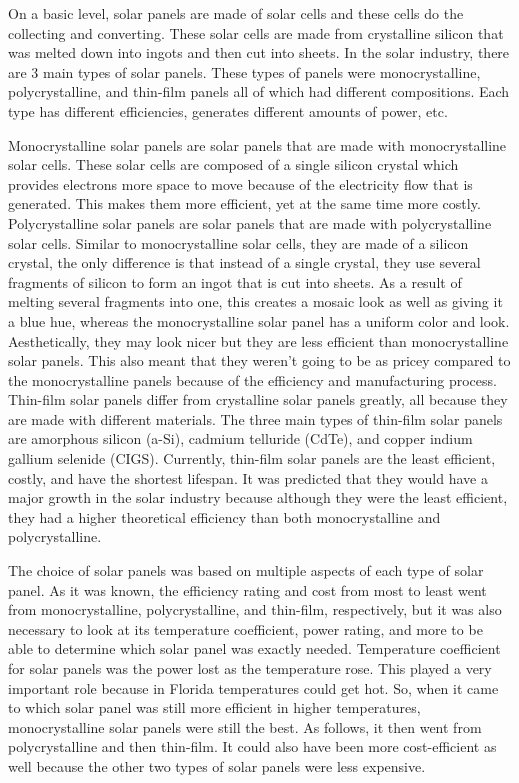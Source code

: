 On a basic level, solar panels are made of solar cells and these cells do the collecting and converting. These solar cells are made from crystalline silicon that was melted down into ingots and then cut into sheets. In the solar industry, there are 3 main types of solar panels. These types of panels were monocrystalline, polycrystalline, and thin-film panels all of which had different compositions. Each type has different efficiencies, generates different amounts of power, etc.

Monocrystalline solar panels are solar panels that are made with monocrystalline solar cells. These solar cells are composed of a single silicon crystal which provides electrons more space to move because of the electricity flow that is generated. This makes them more efficient, yet at the same time more costly. Polycrystalline solar panels are solar panels that are made with polycrystalline solar cells. Similar to monocrystalline solar cells, they are made of a silicon crystal, the only difference is that instead of a single crystal, they use several fragments of silicon to form an ingot that is cut into sheets. As a result of melting several fragments into one, this creates a mosaic look as well as giving it a blue hue, whereas the monocrystalline solar panel has a uniform color and look. Aesthetically, they may look nicer but they are less efficient than monocrystalline solar panels. This also meant that they weren’t going to be as pricey compared to the monocrystalline panels because of the efficiency and manufacturing process. Thin-film solar panels differ from crystalline solar panels greatly, all because they are made with different materials. The three main types of thin-film solar panels are amorphous silicon (a-Si), cadmium telluride (CdTe), and copper indium gallium selenide (CIGS). Currently, thin-film solar panels are the least efficient, costly, and have the shortest lifespan. It was predicted that they would have a major growth in the solar industry because although they were the least efficient, they had a higher theoretical efficiency than both monocrystalline and polycrystalline.

The choice of solar panels was based on multiple aspects of each type of solar panel. As it was known, the efficiency rating and cost from most to least went from monocrystalline, polycrystalline, and thin-film, respectively, but it was also necessary to look at its temperature coefficient, power rating, and more to be able to determine which solar panel was exactly needed. Temperature coefficient for solar panels was the power lost as the temperature rose. This played a very important role because in Florida temperatures could get hot. So, when it came to which solar panel was still more efficient in higher temperatures, monocrystalline solar panels were still the best. As follows, it then went from polycrystalline and then thin-film. It could also have been more cost-efficient as well because the other two types of solar panels were less expensive.

